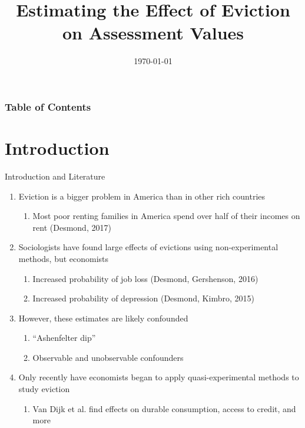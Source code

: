 \documentclass [xcolor=svgnames, t] {beamer}
\title[Eviction and Property Values]{Estimating the Effect of Eviction on Assessment Values}
\author[Arjun Shanmugam]{}
\date{\today}
\begin{document}
\begin{frame}
\maketitle
\end{frame}


\begin{frame}
\frametitle{Table of Contents}
\tableofcontents
\end{frame}

\section{Introduction}
\begin{frame}{Introduction and Literature}
   \begin{enumerate}
       \item Eviction is a bigger problem in America than in other rich countries
       \begin{enumerate}
           \item Most poor renting families in America
spend over half of their incomes on rent (Desmond, 2017)
       \end{enumerate}
       \item Sociologists have found large effects of evictions using non-experimental methods, but economists 
       \begin{enumerate}
           \item Increased probability of job loss (Desmond, Gershenson, 2016)
           \item Increased probability of depression (Desmond, Kimbro, 2015)
       \end{enumerate} 
       \item However, these estimates are likely confounded
       \begin{enumerate}
           \item ``Ashenfelter dip''
           \item Observable and unobservable confounders
       \end{enumerate}
       \item Only recently have economists began to apply quasi-experimental methods to study eviction
        \begin{enumerate}
            \item Van Dijk et al. find effects on durable consumption, access to credit, and more
        \end{enumerate}
   \end{enumerate}
\end{frame}
\end{document}
